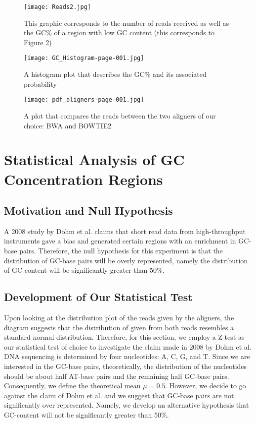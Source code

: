\documentclass[12pt]{article}
\begin{document}
\begin{figure}
    \centering
    \texttt{[image: Reads2.jpg]}
    \caption{This graphic corresponds to the number of reads received as well as the GC\% of a region with low GC content (this corresponds to Figure 2)}
    \label{Figure 3}
\end{figure}


\begin{figure}
    \centering
    \texttt{[image: GC\_Histogram-page-001.jpg]}
    \caption{A histogram plot that describes the GC\% and its associated probability}
    \label{Figure 3}

    \texttt{[image: pdf\_aligners-page-001.jpg]}
    \caption{A plot that compares the reads between the two aligners of our choice: BWA and BOWTIE2}
    \label{Figure 4}
\end{figure}


%
%

\newpage

\section{Statistical Analysis of GC Concentration Regions}

\subsection{Motivation and Null Hypothesis}
{A 2008 study by Dohm et al. claims that short read data from high-throughput instruments gave a bias and generated certain regions with an enrichment in GC-base pairs. Therefore, the null hypothesis for this experiment is that the distribution of GC-base pairs will be overly represented, namely the distribution of GC-content will be significantly greater than $50\%$.}

\subsection{Development of Our Statistical Test}
{Upon looking at the distribution plot of the reads given by the aligners, the diagram suggests that the distribution of given from both reads resembles a standard normal distribution. Therefore, for this section, we employ a Z-test as our statistical test of choice to investigate the claim made in 2008 by Dohm et al. DNA sequencing is determined by four nucleotides: A, C, G, and T. Since we are interested in the GC-base pairs, theoretically, the distribution of the nucleotides should be about half AT-base pairs and the remaining half GC-base pairs. Consequently, we define the theoretical mean $\mu=0.5$. However, we decide to go against the claim of Dohm et al. and we suggest that GC-base pairs are not significantly over represented. Namely, we develop an alternative hypothesis that GC-content will not be significantly greater than $50\%$.}
\end{document}
